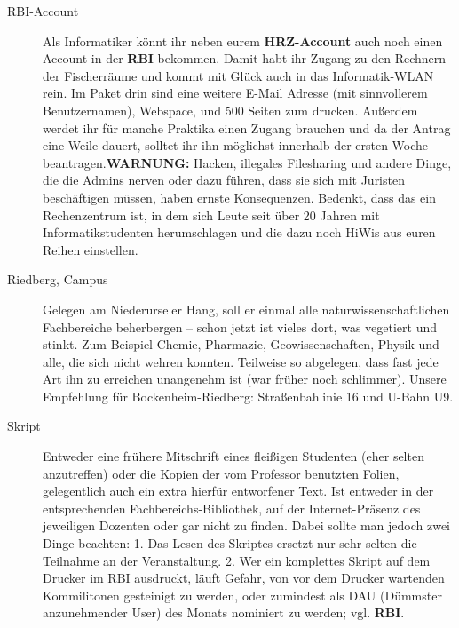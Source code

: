 \begin{description}
\item[RBI-Account] Als Informatiker könnt ihr neben eurem
\textbf{HRZ-Account} auch noch einen Account in der \textbf{RBI}
bekommen. Damit habt ihr Zugang zu den Rechnern der Fischerräume und
kommt mit Glück auch in das Informatik-WLAN rein. Im Paket drin sind
eine weitere E-Mail Adresse (mit sinnvollerem Benutzernamen),
Webspace, und 500 Seiten zum drucken.  Außerdem werdet ihr für manche
Praktika einen Zugang brauchen und da der Antrag eine Weile dauert,
solltet ihr ihn möglichst innerhalb der ersten Woche
beantragen.\textbf{WARNUNG:} Hacken, illegales Filesharing und andere
Dinge, die die Admins nerven oder dazu führen, dass sie sich mit
Juristen beschäftigen müssen, haben ernste Konsequenzen.
Bedenkt, dass das ein Rechenzentrum ist, in dem sich
Leute seit über 20 Jahren mit Informatikstudenten herumschlagen und
die dazu noch HiWis aus euren Reihen einstellen.



\item[Riedberg, Campus] Gelegen am Niederurseler Hang, soll er einmal
alle naturwissenschaftlichen Fachbereiche beherbergen -- schon jetzt
ist vieles dort, was vegetiert und stinkt. Zum Beispiel Chemie,
Pharmazie, Geowissenschaften, Physik und alle, die sich nicht wehren
konnten. Teilweise so abgelegen, dass fast jede Art ihn zu erreichen
unangenehm ist (war früher noch schlimmer). Unsere Empfehlung für
Bockenheim-Riedberg: Straßenbahlinie 16 und U-Bahn U9.





\item[Skript] Entweder eine frühere Mitschrift eines fleißigen
Studenten (eher selten anzutreffen) oder die Kopien der vom Professor
benutzten Folien, gelegentlich auch ein extra hierfür entworfener
Text. Ist entweder in der entsprechenden Fachbereichs-Bibliothek, auf
der Internet-Präsenz des jeweiligen Dozenten oder gar nicht zu finden.
Dabei sollte man jedoch zwei Dinge beachten: 1. Das Lesen des Skriptes
ersetzt nur sehr selten die Teilnahme an der Veranstaltung. 2. Wer ein
komplettes Skript auf dem Drucker im RBI ausdruckt, läuft Gefahr, von
vor dem Drucker wartenden Kommilitonen gesteinigt zu werden, oder
zumindest als DAU (Dümmster anzunehmender User) des Monats nominiert
zu werden; vgl. \textbf{RBI}.



\end{description}
